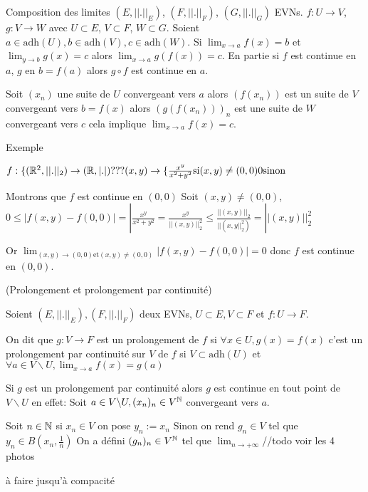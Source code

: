 \documentclass[a4paper, 12pt]{article}
\begin{document}
\begin{proposition}{Composition des limites}{}
    $(E, ||.||_E)$, $(F, ||.||_F)$, $(G, ||.||_G)$ EVNs.
    $f: U \rightarrow V$, $g: V \rightarrow W$ avec $U \subset E$, $V \subset F$, $W \subset G$.
    Soient $a \in \text{adh}(U), b \in \text{adh}(V), c \in \text{adh}(W)$.
    Si $\lim_{x \to a}f(x) = b$ et $\lim_{y \to b}g(x) = c$
    alors $\lim_{x \to a}g(f(x)) = c$.
    En partie si $f$ est continue en $a$, $g$ en $b=f(a)$ alors $g \circ f$ est continue en $a$.
\end{proposition}

\begin{demonstration}
    Soit $(x_n)$ une suite de $U$ convergeant vers $a$ alors $(f(x_n))$ est un suite de $V$ convergeant
    vers $b = f(x)$ alors $(g(f(x_n)))_n$ est une suite de $W$ convergeant vers $c$
    cela implique $\lim_{x \to a}f(x) = c$.
\end{demonstration}

Exemple

$f: \{ (\mathbb{R}^2, ||.||_2) \rightarrow (\mathbb{R}, |.|) \text{???} (x, y) \to \{ \frac{x^y}{x^2 + y^2} \text{si} (x, y) \neq (0, 0) 0 \text{sinon}$

Montrons que $f$ est continue en $(0,0)$
Soit $(x, y) \neq (0, 0)$, $0 \leq |f(x, y) - f(0, 0)| = |\frac{x^y}{x^2 + y^2} = \frac{x^y}{||(x, y)||^2_2} \leq \frac{||(x, y)||_2}{||(x, y||^2_2)} = ||(x, y)||^2_2$

Or $\lim_{(x, y) \to (0, 0) \text{et} (x, y) \neq (0, 0)}|f(x, y)- f(0,0)| = 0$
donc $f$ est continue en $(0,0)$.

\begin{definition}
    (Prolongement et prolongement par continuité)
    
    Soient $(E, ||.||_E), (F, ||.||_F)$ deux EVNs, $U \subset E, V \subset F$ et $f: U \rightarrow F$.

    On dit que $g: V \rightarrow F$ est un prolongement de $f$ si $\forall x \in U, g(x) = f(x)$
    c'est un prolongement par continuité sur $V$ de $f$ si $V \subset \text{adh}(U)$ et $\forall a \in V\backslash U, \lim_{x \to a}f(x) = g(a)$
\end{definition}

\begin{remarque}
    Si $g$ est un prolongement par continuité alors $g$ est continue en tout point de $V\backslash U$
    en effet: Soit $a \in V\backslash U, (x_n)_n \in V^{\mathbb{N}}$ convergeant vers $a$.

    Soit $n \in \mathbb{N}$ si $x_n \in V$ on pose $y_n := x_n$
    Sinon on rend $g_n \in V$ tel que $y_n \in B(x_n, \frac{1}{n})$
    On a défini $(g_n)_n \in V^{\mathbb{N}}$ tel que $\lim_{n \to +\infty} $//todo voir les 4 photos
\end{remarque}

\begin{hotwarn}
    à faire jusqu'à compacité
\end{hotwarn}
\end{document}
